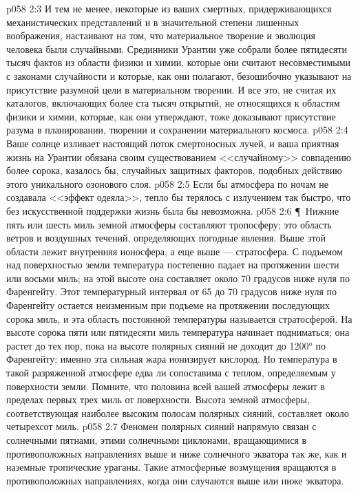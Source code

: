 \vs p058 2:3 И тем не менее, некоторые из ваших смертных, придерживающихся механистических представлений и в значительной степени лишенных воображения, настаивают на том, что материальное творение и эволюция человека были случайными. Срединники Урантии уже собрали более пятидесяти тысяч фактов из области физики и химии, которые они считают несовместимыми с законами случайности и которые, как они полагают, безошибочно указывают на присутствие разумной цели в материальном творении. И все это, не считая их каталогов, включающих более ста тысяч открытий, не относящихся к областям физики и химии, которые, как они утверждают, тоже доказывают присутствие разума в планировании, творении и сохранении материального космоса.
\vs p058 2:4 Ваше солнце изливает настоящий поток смертоносных лучей, и ваша приятная жизнь на Урантии обязана своим существованием <<случайному>> совпадению более сорока, казалось бы, случайных защитных факторов, подобных действию этого уникального озонового слоя.
\vs p058 2:5 Если бы атмосфера по ночам не создавала <<эффект одеяла>>, тепло бы терялось с излучением так быстро, что без искусственной поддержки жизнь была бы невозможна.
\vs p058 2:6 \P\ Нижние пять или шесть миль земной атмосферы составляют тропосферу; это область ветров и воздушных течений, определяющих погодные явления. Выше этой области лежит внутренняя ионосфера, а еще выше --- стратосфера. С подъемом над поверхностью земли температура постепенно падает на протяжении шести или восьми миль; на этой высоте она составляет около 70 градусов ниже нуля по Фаренгейту. Этот температурный интервал от 65 до 70 градусов ниже нуля по Фаренгейту остается неизменным при подъеме на протяжении последующих сорока миль, и эта область постоянной температуры называется стратосферой. На высоте сорока пяти или пятидесяти миль температура начинает подниматься; она растет до тех пор, пока на высоте полярных сияний не доходит до 1200° по Фаренгейту; именно эта сильная жара ионизирует кислород. Но температура в такой разряженной атмосфере едва ли сопоставима с теплом, определяемым у поверхности земли. Помните, что половина всей вашей атмосферы лежит в пределах первых трех миль от поверхности. Высота земной атмосферы, соответствующая наиболее высоким полосам полярных сияний, составляет около четырехсот миль.
\vs p058 2:7 Феномен полярных сияний напрямую связан с солнечными пятнами, этими солнечными циклонами, вращающимися в противоположных направлениях выше и ниже солнечного экватора так же, как и наземные тропические ураганы. Такие атмосферные возмущения вращаются в противоположных направлениях, когда они случаются выше или ниже экватора.

